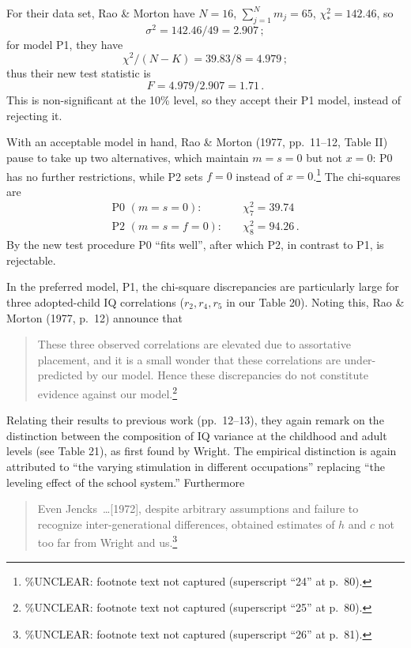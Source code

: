﻿\documentclass[12pt]{article}
\begin{document}
For their data set, Rao \& Morton have $N=16$, $\sum_{j=1}^{N} m_j = 65$, $\chi_*^2=142.46$, so
\begin{equation*}
\sigma^2 = 142.46/49 = 2.907 \, ;
\end{equation*}
for model P1, they have
\begin{equation*}
\chi^2/(N-K) = 39.83/8 = 4.979 \, ;
\end{equation*}
thus their new test statistic is
\begin{equation*}
F = 4.979/2.907 = 1.71 \, .
\end{equation*}
This is non-significant at the 10\% level, so they accept their P1 model, instead of rejecting it.

With an acceptable model in hand, Rao \& Morton (1977, pp.\ 11--12, Table II) pause to take up two alternatives, which maintain $m=s=0$ but not $x=0$: P0 has no further restrictions, while P2 sets $f=0$ instead of $x=0$.\footnote{\%UNCLEAR: footnote text not captured (superscript ``24'' at p.\ 80).} The chi-squares are
\begin{align*}
\text{P0 } (m=s=0): & \quad \chi_7^2 = 39.74 \\
\text{P2 } (m=s=f=0): & \quad \chi_8^2 = 94.26 \, .
\end{align*}
By the new test procedure P0 ``fits well'', after which P2, in contrast to P1, is rejectable.

In the preferred model, P1, the chi-square discrepancies are particularly large for three adopted-child IQ correlations ($r_2, r_4, r_5$ in our Table 20). Noting this, Rao \& Morton (1977, p.\ 12) announce that

\begin{quote}
These three observed correlations are elevated due to assortative placement, and it is a small wonder that these correlations are under-predicted by our model. Hence these discrepancies do not constitute evidence against our model.\footnote{\%UNCLEAR: footnote text not captured (superscript ``25'' at p.\ 80).}
\end{quote}

Relating their results to previous work (pp.\ 12--13), they again remark on the distinction between the composition of IQ variance at the childhood and adult levels (see Table 21), as first found by Wright. The empirical distinction is again attributed to ``the varying stimulation in different occupations'' replacing ``the leveling effect of the school system.'' Furthermore

\begin{quote}
Even Jencks~\ldots [1972], despite arbitrary assumptions and failure to recognize inter-generational differences, obtained estimates of $h$ and $c$ not too far from Wright and us.\footnote{\%UNCLEAR: footnote text not captured (superscript ``26'' at p.\ 81).}
\end{quote}
\end{document}
